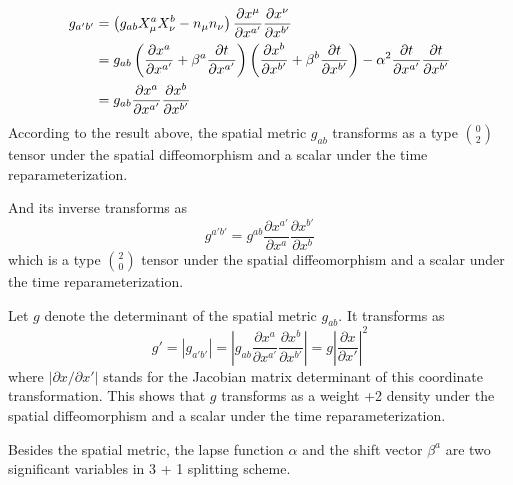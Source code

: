 \documentclass[letterpaper,nofootinbib,prd,amsmath,onecolumn]{revtex4-1}
\begin{document}
\begin{align}
g_{a'b'} & = \left(g_{ab}X^{a}_{\mu}X^{b}_{\nu} - n_{\mu}n_{\nu}\right)\frac{\partial x^{\mu}}{\partial x^{a'}}\frac{\partial x^{\nu}}{\partial x^{b'}}\notag\\
&= g_{ab}\left(\frac{\partial x^{a}}{\partial x^{a'}} + \beta^{a}\frac{\partial t}{\partial x^{a'}}\right)\left(\frac{\partial x^{b}}{\partial x^{b'}} + \beta^{b}\frac{\partial t}{\partial x^{b'}}\right) - \alpha^2\frac{\partial t}{\partial x^{a'}}\frac{\partial t}{\partial x^{b'}}\notag\\
& = g_{ab}\frac{\partial x^{a}}{\partial x^{a'}}\frac{\partial x^{b}}{\partial x^{b'}}
\end{align}
According to the result above, the spatial metric $g_{ab}$ transforms as a type $0 \choose 2$ tensor under the spatial diffeomorphism and a scalar under the time reparameterization.

 
And its inverse transforms as
\begin{equation}
g^{a'b'} = g^{ab}\frac{\partial x^{a'}}{\partial x^{a}}\frac{\partial x^{b'}}{\partial x^{b}}\label{spatial metric}
\end{equation}
which is a type $2 \choose 0$ tensor under the spatial diffeomorphism and a scalar under the time reparameterization. 


Let $g$ denote the determinant of the spatial metric $g_{ab}$. It transforms as
\begin{equation}
g' = \left|g_{a'b'}\right| = \left|g_{ab}\frac{\partial x^{a}}{\partial x^{a'}}\frac{\partial x^{b}}{\partial x^{b'}}\right|  = g\left|\frac{\partial x}{\partial x'}\right|^{2}
\end{equation}
where $\left|\partial x/\partial x'\right|$ stands for the Jacobian matrix determinant of this coordinate transformation. This shows that $g$ transforms as a weight +2 density under the spatial diffeomorphism and a scalar under the time reparameterization. 
 
Besides the spatial metric, the lapse function $\alpha$ and the shift vector $\beta^{a}$ are two significant variables in 3 + 1 splitting scheme. 
\end{document}
